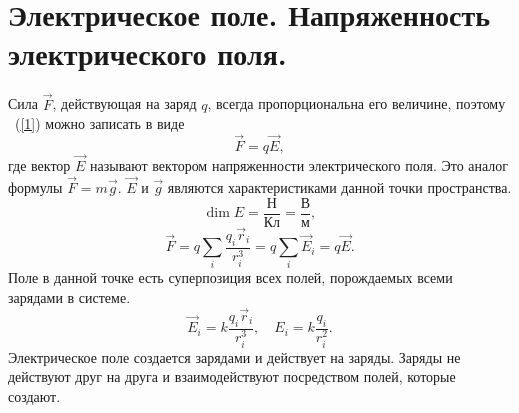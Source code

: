 \section{Электрическое поле. Напряженность \,\, электрического поля.}

	Сила $\vec{F}$, действующая на заряд $q$, всегда пропорциональна его величине, поэтому ~(\ref{1}) можно записать в виде
		$$\vec{F} = q\vec{E},$$
	где вектор $\vec{E}$ называют вектором напряженности электрического поля. Это аналог формулы $\vec{F}=m\vec{g}$. $\vec{E}$ и $\vec{g}$ являются характеристиками данной точки пространства.
		$$\dim{E}=\frac{\text{Н}}{\text{Кл}}=\frac{\text{В}}{\text{м}},$$
		$$\vec{F}=q\sum_i \frac{q_i\vec{r}_i}{r_i^3}=q\sum_i \vec{E}_i=q\vec{E}.$$
	Поле в данной точке есть суперпозиция всех полей, порождаемых всеми зарядами в системе.	
		$$\vec{E}_i=k\frac{q_i\vec{r}_i}{r_i^3}, \quad E_i = k\frac{q_i}{r_i^2}.$$
	Электрическое поле создается зарядами и действует на заряды. Заряды не действуют друг на друга и взаимодействуют посредством полей, которые создают.